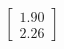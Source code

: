 \documentclass[preview]{standalone}
\begin{document}
\begin{align*}
\begin{bmatrix} 1.90 \\ 2.26 \end{bmatrix}
\end{align*}
\end{document}
